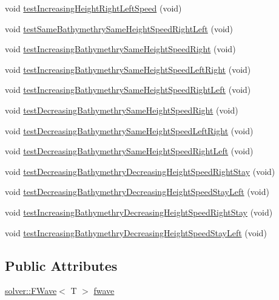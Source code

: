 \begin{DoxyCompactItemize}
\item 
void \hyperlink{classFWaveTest_aaf371e755b499555a6daf142c9e5173f}{test\+Increasing\+Height\+Right\+Left\+Speed} (void)
\item 
void \hyperlink{classFWaveTest_a057ce2e1296eff8b0c0ac4375e138011}{test\+Same\+Bathymethry\+Same\+Height\+Speed\+Right\+Left} (void)
\item 
void \hyperlink{classFWaveTest_ab0572f33ee9ccb4afe2c7baa60d16c0d}{test\+Increasing\+Bathymethry\+Same\+Height\+Speed\+Right} (void)
\item 
void \hyperlink{classFWaveTest_a1c3618e75d53d97441ef3428e772379b}{test\+Increasing\+Bathymethry\+Same\+Height\+Speed\+Left\+Right} (void)
\item 
void \hyperlink{classFWaveTest_a0cf1f7a1f610b71bf50af3f0a63cdbe0}{test\+Increasing\+Bathymethry\+Same\+Height\+Speed\+Right\+Left} (void)
\item 
void \hyperlink{classFWaveTest_a0867052447bec4907c2eca7b88560332}{test\+Decreasing\+Bathymethry\+Same\+Height\+Speed\+Right} (void)
\item 
void \hyperlink{classFWaveTest_ad3749665fb9da5f1a3a8ef91ad18fce6}{test\+Decreasing\+Bathymethry\+Same\+Height\+Speed\+Left\+Right} (void)
\item 
void \hyperlink{classFWaveTest_a3fa1cc4adf7e7b7807639e46e63d17cc}{test\+Decreasing\+Bathymethry\+Same\+Height\+Speed\+Right\+Left} (void)
\item 
void \hyperlink{classFWaveTest_ad1036122e27c158bc42008f4804b9fd2}{test\+Decreasing\+Bathymethry\+Decreasing\+Height\+Speed\+Right\+Stay} (void)
\item 
void \hyperlink{classFWaveTest_abb0e42e169ed6cbc63c9bf76da0da5d4}{test\+Decreasing\+Bathymethry\+Decreasing\+Height\+Speed\+Stay\+Left} (void)
\item 
void \hyperlink{classFWaveTest_a0d88b8b7e5961938c2919d58998d92f5}{test\+Increasing\+Bathymethry\+Decreasing\+Height\+Speed\+Right\+Stay} (void)
\item 
void \hyperlink{classFWaveTest_a0532fd78c0b907b09dc229ca8be2ac81}{test\+Increasing\+Bathymethry\+Decreasing\+Height\+Speed\+Stay\+Left} (void)
\end{DoxyCompactItemize}
\subsection*{Public Attributes}
\begin{DoxyCompactItemize}
\item 
\hyperlink{classsolver_1_1FWave}{solver\+::\+F\+Wave}$<$ T $>$ \hyperlink{classFWaveTest_a195e044738f434127bedf96c2153f230}{fwave}
\end{DoxyCompactItemize}
